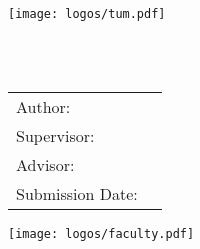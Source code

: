 \begin{titlepage}
  \centering

  \vspace{40mm}
  \texttt{[image: logos/tum.pdf]}

  \vspace{5mm}
  {\huge\MakeUppercase{\getFaculty{}}}\\

  \vspace{5mm}
  {\large\MakeUppercase{\getUniversity{}}}\\

  \vspace{20mm}
  {\Large \getDoctype{}}

  \vspace{15mm}
  {\huge\bfseries \getTitle{}}

  \vspace{15mm}
  \begin{tabular}{l l}
    Author: & \getAuthor{} \\
    Supervisor: & \getSupervisor{} \\
    Advisor: & \getAdvisor{} \\
    Submission Date: & \getSubmissionDate{} \\
  \end{tabular}

	\centering
  \vspace{15mm}
  \texttt{[image: logos/faculty.pdf]}
\end{titlepage}
